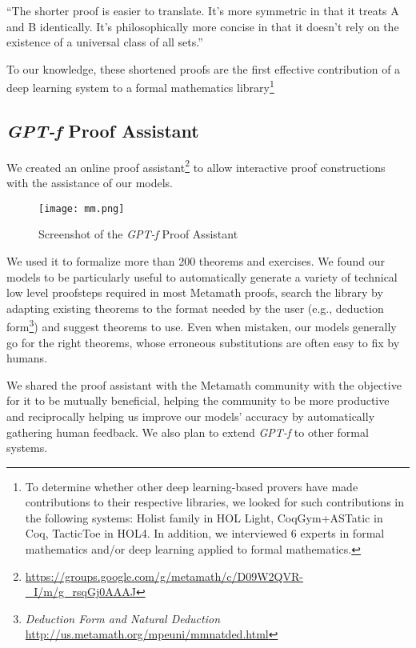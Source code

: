 \documentclass{article}
\begin{document}
\begin{displayquote}
“The shorter proof is easier to translate. It’s more symmetric in that it treats A and B identically. It’s philosophically more concise in that it doesn’t rely on the existence of a universal class of all sets.”
\end{displayquote}

To our knowledge, these shortened proofs are the first effective contribution of a deep learning system to a formal mathematics library\footnote{To determine whether other deep learning-based provers have made contributions to their respective libraries, we looked for such contributions in the following systems: Holist family in HOL Light, CoqGym+ASTatic in Coq, TacticToe in HOL4. In addition, we interviewed 6 experts in formal mathematics and/or deep learning applied to formal mathematics.}

\subsection{\textit{GPT-f} Proof Assistant}
\label{section:gptfproofassistant}

We created an online proof assistant\footnote{\url{https://groups.google.com/g/metamath/c/D09W2QVR-_I/m/g_rsqGj0AAAJ}} to allow interactive proof constructions with the assistance of our models.

\begin{figure}
    \texttt{[image: mm.png]}
    \caption{Screenshot of the \textit{GPT-f} Proof Assistant}
    \label{fig:mm}
\end{figure}

We used it to formalize more than 200 theorems and exercises. We found our models to be particularly useful to automatically generate a variety of technical low level proofsteps required in most Metamath proofs, search the library by adapting existing theorems to the format needed by the user (e.g., deduction form\footnote{\textit{Deduction Form and Natural Deduction} \url{http://us.metamath.org/mpeuni/mmnatded.html}}) and suggest theorems to use. Even when mistaken, our models generally go for the right theorems, whose erroneous substitutions are often easy to fix by humans.

We shared the proof assistant with the Metamath community with the objective for it to be mutually beneficial, helping the community to be more productive and reciprocally helping us improve our models' accuracy by automatically gathering human feedback. We also plan to extend \textit{GPT-f} to other formal systems.
\end{document}
